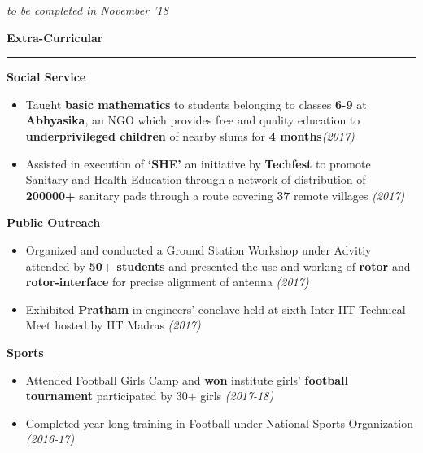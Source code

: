 \documentclass[8pt]{article}%
\begin{document}
{\begin{tabular}{l l}
\end{tabular}

\vspace{3mm}
\hspace{-5mm}
{\em * to be completed in November '18}
\begin{flushleft}
\bf{\Large{Extra-Curricular}}
\end{flushleft}
\hrule

{\flushleft \bf {Social Service}}
\begin{itemize}
    \item Taught {\bf basic mathematics} to students belonging to classes {\bf 6-9} at {\bf Abhyasika}, an NGO which provides free and quality education to {\bf underprivileged children} of nearby slums for {\bf 4 months}{\hfill \em (2017)}
    
    \item Assisted in execution of {\bf `SHE'} an initiative by {\bf Techfest} to promote Sanitary and Health Education through a network
of distribution of {\bf 200000+} sanitary pads through a route covering {\bf 37} remote villages {\hfill \em (2017)}

   \end{itemize}


{\flushleft \bf {Public Outreach}}
\begin{itemize}
\item Organized and conducted a Ground Station Workshop under Advitiy attended by {\bf 50+ students} and presented the use and working of {\bf rotor} and {\bf rotor-interface} for precise alignment of antenna  {\hfill \em (2017)}

    \item Exhibited {\bf Pratham} in engineers' conclave held at sixth Inter-IIT Technical Meet hosted by IIT Madras {\hfill \em (2017)}
     \end{itemize}


{\flushleft \bf {Sports}}
\begin{itemize}
    \item Attended Football Girls Camp and {\bf won} institute girls' {\bf football tournament} participated by 30+ girls     {\hfill \em (2017-18)}
   \item Completed year long training in Football under National Sports Organization {\hfill \em (2016-17)}
   \end{itemize}
}
\end{document}
